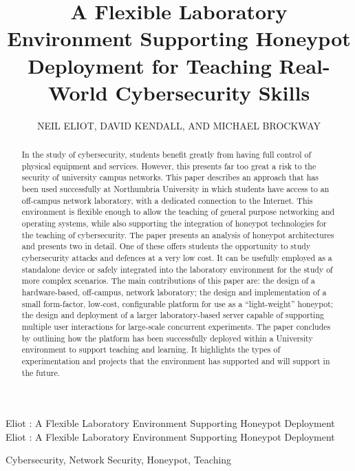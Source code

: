 \documentclass{ieeeaccess}
\begin{document}
  
  \title{A Flexible Laboratory Environment Supporting Honeypot Deployment for Teaching Real-World Cybersecurity Skills}
  \author{\uppercase{Neil Eliot},
  \uppercase{David Kendall, and Michael Brockway}}
  \address[1]{Northumbria University, Department of Computing and Information Sciences, 
  Newcastle upon Tyne, NE1 8ST}
  
  \markboth
  {Eliot \headeretal: A Flexible Laboratory Environment Supporting Honeypot Deployment}
  {Eliot \headeretal: A Flexible Laboratory Environment Supporting Honeypot Deployment}
  
  
\begin{abstract}
  In the study of cybersecurity, students benefit greatly from having full control of physical equipment and services. However, this presents far too great a risk to the security of university campus networks.
  This paper describes an approach that has been used successfully at Northumbria University in which students have access to an off-campus network laboratory, with a dedicated connection to the Internet.
  This environment is flexible enough to allow the teaching of general purpose
  networking and operating systems, while also supporting the integration of honeypot technologies for the teaching of cybersecurity. 
  The paper presents an analysis of honeypot architectures and presents two in detail. One of these offers students the opportunity to study cybersecurity attacks and defences at a very low cost. It can be usefully employed as a standalone device or safely integrated into the laboratory environment for the study of more complex scenarios. 
  The main contributions of this paper are: the design of a hardware-based, off-campus, network laboratory; the design and implementation of a small form-factor, low-cost, configurable platform for use as a ``light-weight'' honeypot; the design and deployment of a larger laboratory-based server capable of supporting multiple user interactions for large-scale concurrent experiments. The paper concludes by outlining how the platform has been successfully deployed within a University environment to support teaching and learning. It highlights the types of experimentation and projects that the environment has supported and will support in the future.
\end{abstract}
\begin{IEEEkeywords}
  Cybersecurity, Network Security, Honeypot, Teaching
\end{IEEEkeywords}
\titlepgskip=-15pt
\maketitle
\end{document}
